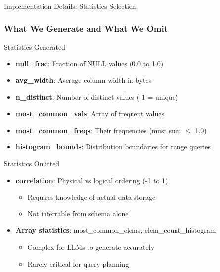 \documentclass{beamer}
\begin{document}
\begin{frame}{Implementation Details: Statistics Selection}
\frametitle{What We Generate and What We Omit}

\begin{block}{Statistics Generated}
\begin{itemize}
    \item \textbf{null\_frac}: Fraction of NULL values (0.0 to 1.0)
    \item \textbf{avg\_width}: Average column width in bytes
    \item \textbf{n\_distinct}: Number of distinct values (-1 = unique)
    \item \textbf{most\_common\_vals}: Array of frequent values
    \item \textbf{most\_common\_freqs}: Their frequencies (must sum $\leq$ 1.0)
    \item \textbf{histogram\_bounds}: Distribution boundaries for range queries
\end{itemize}
\end{block}

\begin{alertblock}{Statistics Omitted}
\begin{itemize}
    \item \textbf{correlation}: Physical vs logical ordering (-1 to 1)
    \begin{itemize}
        \item Requires knowledge of actual data storage
        \item Not inferrable from schema alone
    \end{itemize}
    \item \textbf{Array statistics}: most\_common\_elems, elem\_count\_histogram
    \begin{itemize}
        \item Complex for LLMs to generate accurately
        \item Rarely critical for query planning
    \end{itemize}
\end{itemize}
\end{alertblock}

\end{frame}
\end{document}
